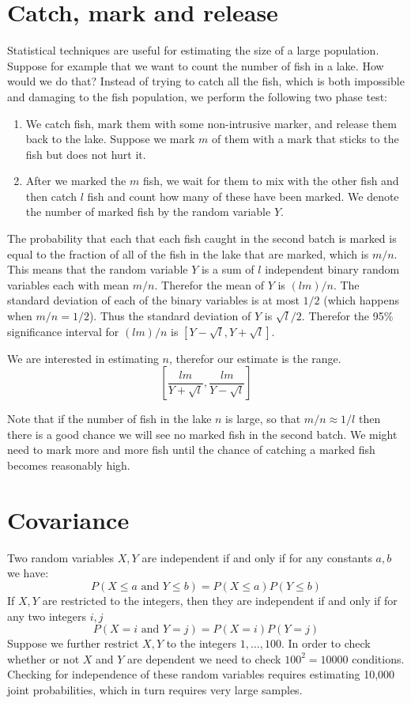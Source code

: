 \section{Catch, mark and release}
Statistical techniques are useful for estimating the size of a large
population. Suppose for example that we want to count the number of
fish in a lake. How would we do that? Instead of trying to catch all
the fish, which is both impossible and damaging to the fish
population, we perform the following two phase test:
\begin{enumerate}
\item We catch fish, mark them with some non-intrusive marker, and
  release them back to the lake. Suppose we mark $m$ of them with a
  mark that sticks to the fish but does not hurt it.
\item After we marked the $m$ fish, we wait for them to mix with the
  other fish and then catch $l$ fish and count how many of these
  have been marked. We denote the number of marked fish by the random
  variable $Y$.
\end{enumerate}
The probability that each that each fish caught in the second batch is
marked is equal to the fraction of all of the fish in the lake that
are marked, which is $m/n$. This means that the random variable $Y$ is
a sum of $l$ independent binary random variables each with mean $m/n$.
Therefor the mean of $Y$ is $(lm)/n$. The standard deviation of each
of the binary variables is at most $1/2$ (which happens when
$m/n=1/2$). Thus the standard deviation of $Y$ is $\sqrt{l}/2$.
Therefor the 95\% significance interval for $(lm)/n$ is
$[Y-\sqrt{l},Y+\sqrt{l}]$.

We are interested in estimating $n$, therefor our estimate is the range.
\[
\left[\frac{lm}{Y+\sqrt{l}}, \frac{lm}{Y-\sqrt{l}} \right]
\]

Note that if the number of fish in the lake $n$ is large, so that $m/n
\approx 1/l$ then there is a good chance we will see no marked fish in
the second batch. We might need to mark more and more fish until the
chance of catching a marked fish becomes reasonably high.

\section{Covariance}

Two random variables $X,Y$ are independent if and only if for any
constants $a,b$
we have:
\[
P(X\leq a \text{ and } Y \leq b)=P(X\leq a)P(Y \leq b)
\]
If $X,Y$ are restricted to the integers, then they are independent if
and only if for any two integers $i,j$
\begin{equation} \label{eqn:independentRVs}
P(X=i \text{ and } Y=j)=P(X=i)P(Y=j)
\end{equation}
Suppose we further restrict $X,Y$ to the integers $1,\ldots,100$. In
order to check whether or not $X$ and $Y$ are dependent we need to
check $100^2=10000$ conditions. Checking for independence of these random
variables requires estimating 10,000 joint probabilities, which in
turn requires very large samples.

